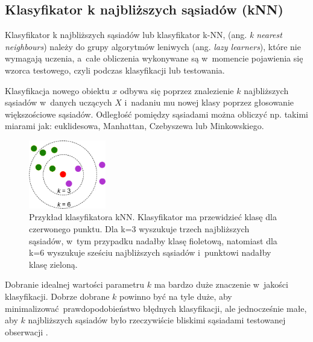 \subsection{Klasyfikator k najbliższych sąsiadów (kNN)}
Klasyfikator k najbliższych sąsiadów lub klasyfikator k-NN, (ang. \textit{k nearest neighbours}) należy do grupy algorytmów leniwych (ang. \textit{lazy learners}), które nie wymagają uczenia, a~całe obliczenia wykonywane są w~momencie pojawienia się wzorca testowego, czyli podczas klasyfikacji lub testowania. \par
Klasyfikacja nowego obiektu $x$ odbywa się poprzez znalezienie $k$ najbliższych sąsiadów w~danych uczących $X$ i~nadaniu mu nowej klasy poprzez głosowanie większościowe sąsiadów. Odległość pomiędzy sąsiadami można obliczyć np. takimi miarami jak: euklidesowa, Manhattan, Czebyszewa lub Minkowskiego. \par
\begin{figure}[H]
	\centering
	\includegraphics[width=0.3\textwidth]{./images/knn.png}
	\caption[Przykład klasyfikatora kNN]{Przykład klasyfikatora kNN. Klasyfikator ma przewidzieć klasę dla czerwonego punktu. Dla k=3 wyszukuje trzech najbliższych sąsiadów, w~tym przypadku nadałby klasę fioletową, natomiast dla k=6 wyszukuje sześciu najbliższych sąsiadów i~punktowi nadałby klasę zieloną.}
	\label{fig:klasknn}
\end{figure}
Dobranie idealnej wartości parametru $k$ ma bardzo duże znaczenie w~jakości klasyfikacji. Dobrze dobrane $k$ powinno być na tyle duże, aby minimalizować prawdopodobieństwo błędnych klasyfikacji, ale jednocześnie małe, aby $k$ najbliższych sąsiadów było rzeczywiście bliskimi sąsiadami testowanej obserwacji \cite{Bishop}. 
